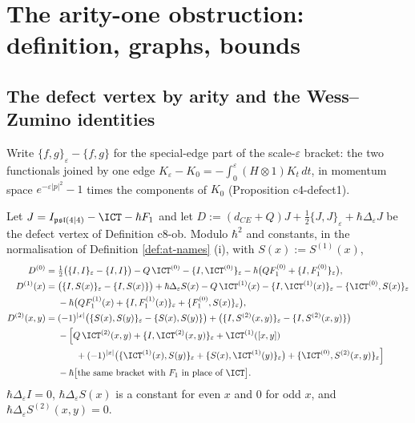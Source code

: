 
\section{The arity-one obstruction: definition, graphs, bounds}
\label{sec:at-ob1}

\subsection{The defect vertex by arity and the Wess--Zumino identities}

Write $\{f,g\}_\varepsilon-\{f,g\}$ for the special-edge part of the scale-$\varepsilon$ bracket: the two functionals joined by one edge $K_\varepsilon-K_0=-\int_0^\varepsilon(H\otimes1)K_t\,dt$, in momentum space $e^{-\varepsilon|p|^2}-1$ times the components of $K_0$ (Proposition c4-defect1).

\begin{lemma}
\label{lem:at-defect}
Let $J=I_{\mathfrak{psl}(4|4)}-\ICT-\hbar F_1$ and let $D:=(d_{CE}+Q)J+\tfrac12\{J,J\}_\varepsilon+\hbar\Delta_\varepsilon J$ be the defect vertex of Definition c8-ob. Modulo $\hbar^2$ and constants, in the normalisation of Definition \ref{def:at-names} (i), with $S(x):=S^{(1)}(x)$,
\begin{equation}
\begin{aligned}
D^{(0)}={}&\tfrac12\big(\{I,I\}_\varepsilon-\{I,I\}\big)-Q\,\ICT^{(0)}-\{I,\ICT^{(0)}\}_\varepsilon-\hbar\big(QF_1^{(0)}+\{I,F_1^{(0)}\}_\varepsilon\big),\\
D^{(1)}(x)={}&\big(\{I,S(x)\}_\varepsilon-\{I,S(x)\}\big)+\hbar\Delta_\varepsilon S(x)-Q\,\ICT^{(1)}(x)-\{I,\ICT^{(1)}(x)\}_\varepsilon-\{\ICT^{(0)},S(x)\}_\varepsilon\\
&-\hbar\big(QF_1^{(1)}(x)+\{I,F_1^{(1)}(x)\}_\varepsilon+\{F_1^{(0)},S(x)\}_\varepsilon\big),\\
D^{(2)}(x,y)={}&(-1)^{|x|}\big(\{S(x),S(y)\}_\varepsilon-\{S(x),S(y)\}\big)+\big(\{I,S^{(2)}(x,y)\}_\varepsilon-\{I,S^{(2)}(x,y)\}\big)\\
&-\Big[Q\,\ICT^{(2)}(x,y)+\{I,\ICT^{(2)}(x,y)\}_\varepsilon+\ICT^{(1)}([x,y])\\
&\qquad+(-1)^{|x|}\big(\{\ICT^{(1)}(x),S(y)\}_\varepsilon+\{S(x),\ICT^{(1)}(y)\}_\varepsilon\big)+\{\ICT^{(0)},S^{(2)}(x,y)\}_\varepsilon\Big]\\
&-\hbar\big[\text{the same bracket with }F_1\text{ in place of }\ICT\big].
\end{aligned}
\label{eq:at-defect}
\end{equation}
$\hbar\Delta_\varepsilon I=0$, $\hbar\Delta_\varepsilon S(x)$ is a constant for even $x$ and $0$ for odd $x$, and $\hbar\Delta_\varepsilon S^{(2)}(x,y)=0$.
\end{lemma}

